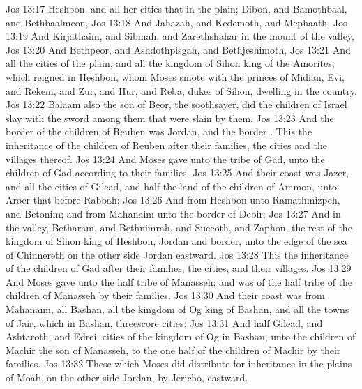 \vs Jos 13:17 Heshbon, and all her cities that  in the plain; Dibon, and Bamothbaal, and Bethbaalmeon,
\vs Jos 13:18 And Jahazah, and Kedemoth, and Mephaath,
\vs Jos 13:19 And Kirjathaim, and Sibmah, and Zarethshahar in the mount of the valley,
\vs Jos 13:20 And Bethpeor, and Ashdothpisgah, and Bethjeshimoth,
\vs Jos 13:21 And all the cities of the plain, and all the kingdom of Sihon king of the Amorites, which reigned in Heshbon, whom Moses smote with the princes of Midian, Evi, and Rekem, and Zur, and Hur, and Reba,  dukes of Sihon, dwelling in the country.
\vs Jos 13:22 Balaam also the son of Beor, the soothsayer, did the children of Israel slay with the sword among them that were slain by them.
\vs Jos 13:23 And the border of the children of Reuben was Jordan, and the border . This  the inheritance of the children of Reuben after their families, the cities and the villages thereof.
\vs Jos 13:24 And Moses gave  unto the tribe of Gad,  unto the children of Gad according to their families.
\vs Jos 13:25 And their coast was Jazer, and all the cities of Gilead, and half the land of the children of Ammon, unto Aroer that  before Rabbah;
\vs Jos 13:26 And from Heshbon unto Ramathmizpeh, and Betonim; and from Mahanaim unto the border of Debir;
\vs Jos 13:27 And in the valley, Betharam, and Bethnimrah, and Succoth, and Zaphon, the rest of the kingdom of Sihon king of Heshbon, Jordan and  border,  unto the edge of the sea of Chinnereth on the other side Jordan eastward.
\vs Jos 13:28 This  the inheritance of the children of Gad after their families, the cities, and their villages.
\vs Jos 13:29 And Moses gave  unto the half tribe of Manasseh: and  was  of the half tribe of the children of Manasseh by their families.
\vs Jos 13:30 And their coast was from Mahanaim, all Bashan, all the kingdom of Og king of Bashan, and all the towns of Jair, which  in Bashan, threescore cities:
\vs Jos 13:31 And half Gilead, and Ashtaroth, and Edrei, cities of the kingdom of Og in Bashan,  unto the children of Machir the son of Manasseh,  to the one half of the children of Machir by their families.
\vs Jos 13:32 These  which Moses did distribute for inheritance in the plains of Moab, on the other side Jordan, by Jericho, eastward.
